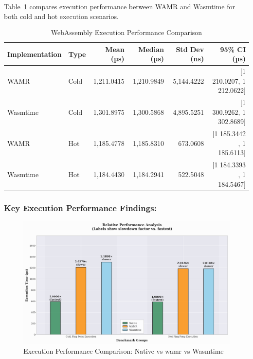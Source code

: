 Table~\ref{tab:wasm-execution} compares execution performance between WAMR and Wasmtime for both cold and hot execution scenarios.

\begin{table}[htbp]
    \centering
    \caption{WebAssembly Execution Performance Comparison}
    \label{tab:wasm-execution}
    \begin{tabular}{llrrrr}
        \toprule
        \textbf{Implementation} & \textbf{Type} & \textbf{Mean (µs)} & \textbf{Median (µs)} & \textbf{Std Dev (ns)} & \textbf{95\% CI (µs)} \\
        \midrule
        WAMR      & Cold  & 1,211.0415 & 1,210.9849 & 5,144.4222 & [1 210.0207, 1 212.0622] \\
        Wasmtime  & Cold  & 1,301.8975 & 1,300.5868 & 4,895.5251 & [1 300.9262, 1 302.8689] \\
        WAMR      & Hot   & 1,185.4778 & 1,185.8310 & 673.0608 & [1 185.3442 , 1 185.6113] \\
        Wasmtime  & Hot   & 1,184.4430 & 1,184.2941 & 522.5048 & [1 184.3393 , 1 184.5467] \\
        \bottomrule
    \end{tabular}
\end{table}

\subsubsection{Key Execution Performance Findings:}

\begin{figure}[htbp]
    \centering
    \includegraphics[width=1.0\textwidth]{images/wasm-execution-relative}
    \caption{Execution Performance Comparison: Native vs \acrshort{wamr} vs Wasmtime}
    \label{fig:wasm-execution-relative}
\end{figure}

